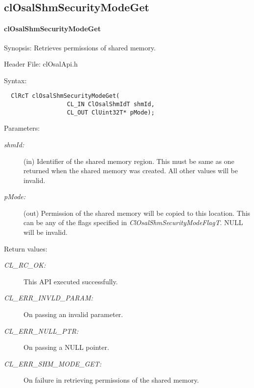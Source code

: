 \subsection{clOsalShmSecurityModeGet}
\hypertarget{pageosal151}{}\paragraph{cl\-Osal\-Shm\-Security\-Mode\-Get}\label{pageosal151}
\begin{Desc}
\item[Synopsis:]Retrieves permissions of shared memory.\end{Desc}
\begin{Desc}
\item[Header File:]clOsalApi.h\end{Desc}
\begin{Desc}
\item[Syntax:]

\footnotesize\begin{verbatim}  ClRcT clOsalShmSecurityModeGet(
                  CL_IN ClOsalShmIdT shmId,
                  CL_OUT ClUint32T* pMode);
\end{verbatim}
\normalsize
\end{Desc}
\begin{Desc}
\item[Parameters:]
\begin{description}
\item[{\em shm\-Id:}](in) Identifier of the shared memory region. This must be same as one returned when the shared memory was created. All other values
will be invalid.\item[{\em p\-Mode:}](out) Permission of the shared memory will be copied to this location. This can be any of the flags specified in {\em Cl\-Osal\-Shm\-Security\-Mode\-Flag\-T\/}. NULL will be invalid.\end{description}
\end{Desc}
\begin{Desc}
\item[Return values:]
\begin{description}
\item[{\em CL\_\-RC\_\-OK:}]This API executed successfully. \item[{\em CL\_\-ERR\_\-INVLD\_\-PARAM:}]On passing an invalid parameter. \item[{\em CL\_\-ERR\_\-NULL\_\-PTR:}]On passing a NULL pointer. \item[{\em CL\_\-ERR\_\-SHM\_\-MODE\_\-GET:}]On failure in retrieving permissions of the shared memory.\end{description}
\end{Desc}
